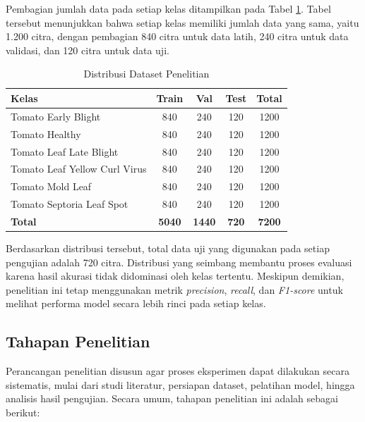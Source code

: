 \begin{sectioncontent}
\begin{subsectioncontent}
    Pembagian jumlah data pada setiap kelas ditampilkan pada Tabel \ref{tab:distribusi-dataset}. Tabel tersebut menunjukkan bahwa setiap kelas memiliki jumlah data yang sama, yaitu 1.200 citra, dengan pembagian 840 citra untuk data latih, 240 citra untuk data validasi, dan 120 citra untuk data uji.

    \begin{table}[H]
        \centering
        \caption{Distribusi Dataset Penelitian}
        \label{tab:distribusi-dataset}
        \renewcommand{\arraystretch}{1.2}
        \begin{tabularx}{\textwidth}{|X|c|c|c|c|}
            \hline
            \textbf{Kelas} & \textbf{Train} & \textbf{Val} & \textbf{Test} & \textbf{Total} \\
            \hline
            Tomato Early Blight & 840 & 240 & 120 & 1200 \\
            \hline
            Tomato Healthy & 840 & 240 & 120 & 1200 \\
            \hline
            Tomato Leaf Late Blight & 840 & 240 & 120 & 1200 \\
            \hline
            Tomato Leaf Yellow Curl Virus & 840 & 240 & 120 & 1200 \\
            \hline
            Tomato Mold Leaf & 840 & 240 & 120 & 1200 \\
            \hline
            Tomato Septoria Leaf Spot & 840 & 240 & 120 & 1200 \\
            \hline
            \textbf{Total} & \textbf{5040} & \textbf{1440} & \textbf{720} & \textbf{7200} \\
            \hline
        \end{tabularx}
    \end{table}

    Berdasarkan distribusi tersebut, total data uji yang digunakan pada setiap pengujian adalah 720 citra. Distribusi yang seimbang membantu proses evaluasi karena hasil akurasi tidak didominasi oleh kelas tertentu. Meskipun demikian, penelitian ini tetap menggunakan metrik \textit{precision}, \textit{recall}, dan \textit{F1-score} untuk melihat performa model secara lebih rinci pada setiap kelas.
\end{subsectioncontent}

\subsection{Tahapan Penelitian}
\begin{subsectioncontent}
    \hspace{\parindent}Perancangan penelitian disusun agar proses eksperimen dapat dilakukan secara sistematis, mulai dari studi literatur, persiapan dataset, pelatihan model, hingga analisis hasil pengujian. Secara umum, tahapan penelitian ini adalah sebagai berikut:


\end{subsectioncontent}
\end{sectioncontent}

